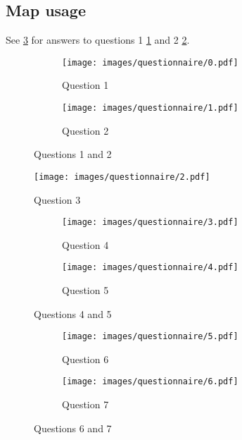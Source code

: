 \subsection{Map usage}

See \ref{fig:q 1 and 2} for answers to questions 1 \ref{fig:q 1} and 2 \ref{fig:q 2}.

\begin{figure}[H]
	\centering
	\begin{subfigure}[b]{0.5\textwidth}
		\centering
		\texttt{[image: images/questionnaire/0.pdf]}
		\caption{Question 1}
		\label{fig:q 1}
	\end{subfigure}%
	\hfill
	\begin{subfigure}[b]{0.5\textwidth}
		\centering
		\texttt{[image: images/questionnaire/1.pdf]}
		\caption{Question 2}
		\label{fig:q 2}
	\end{subfigure}%
	\caption{Questions 1 and 2}
	\label{fig:q 1 and 2}
\end{figure}

\begin{figure}[H]
	\centering
	\texttt{[image: images/questionnaire/2.pdf]}
	\caption{Question 3}
	\label{fig:q 3}
\end{figure}

\begin{figure}[H]
	\centering
	\begin{subfigure}[b]{0.5\textwidth}
		\centering
		\texttt{[image: images/questionnaire/3.pdf]}
		\caption{Question 4}
		\label{fig:q 4}
	\end{subfigure}%
	\hfill
	\begin{subfigure}[b]{0.5\textwidth}
		\centering
		\texttt{[image: images/questionnaire/4.pdf]}
		\caption{Question 5}
		\label{fig:q 5}
	\end{subfigure}%
	\caption{Questions 4 and 5}
	\label{fig:q 4 and 5}
\end{figure}

\begin{figure}[H]
	\centering
	\begin{subfigure}[b]{0.5\textwidth}
		\centering
		\texttt{[image: images/questionnaire/5.pdf]}
		\caption{Question 6}
		\label{fig:q 6}
	\end{subfigure}%
	\hfill
	\begin{subfigure}[b]{0.5\textwidth}
		\centering
		\texttt{[image: images/questionnaire/6.pdf]}
		\caption{Question 7}
		\label{fig:q 7}
	\end{subfigure}%
	\caption{Questions 6 and 7}
	\label{fig:q 6 and 7}
\end{figure}

